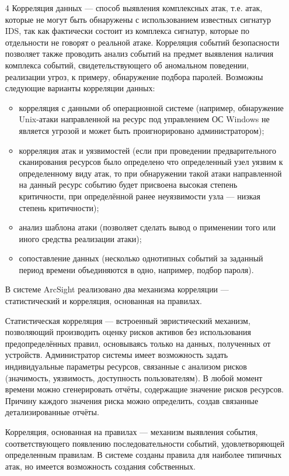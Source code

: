 \begin{enumerate}
    \item[4] Корреляция данных --- способ выявления комплексных атак, т.е. атак, которые не могут быть обнаружены с использованием известных сигнатур IDS, так как фактически состоит из комплекса сигнатур, которые по отдельности не говорят о реальной атаке. Корреляция событий безопасности позволяет также проводить анализ событий на предмет выявления наличия комплекса событий, свидетельствующего об аномальном поведении, реализации угроз, к примеру, обнаружение подбора паролей.
    Возможны следующие варианты корреляции данных:
    \begin{itemize}
        \item корреляция с данными об операционной системе (например, обнаружение Unix-атаки направленной на ресурс под управлением ОС Windows не является угрозой и может быть проигнорировано администратором);
        \item корреляция атак и уязвимостей (если при проведении предварительного сканирования ресурсов было определено что определенный узел уязвим к определенному виду атак, то при обнаружении такой атаки направленной на данный ресурс событию будет присвоена высокая степень критичности, при определённой ранее неуязвимости узла --- низкая степень критичности);
        \item анализ шаблона атаки (позволяет сделать вывод о применении того или иного средства реализации атаки);
        \item сопоставление данных (несколько однотипных событий за заданный период времени объединяются в одно, например, подбор пароля).
    \end{itemize}
    
    В системе ArcSight реализовано два механизма корреляции --- статистический и корреляция, основанная на правилах.
    
    Статистическая корреляция --- встроенный эвристический механизм, позволяющий производить оценку рисков активов без использования предопределённых правил, основываясь только на данных, полученных от устройств. Администратор системы имеет возможность задать индивидуальные параметры ресурсов, связанные с анализом рисков (значимость, уязвимость, доступность пользователям). В любой момент времени можно сгенерировать отчёты, содержащие значение рисков ресурсов. Причину каждого значения риска можно определить, создав связанные детализированные отчёты.
    
    Корреляция, основанная на правилах --- механизм выявления события, соответствующего появлению последовательности событий, удовлетворяющей определенным правилам. В системе созданы правила для наиболее типичных атак, но имеется возможность создания собственных. 
    

\end{enumerate}
